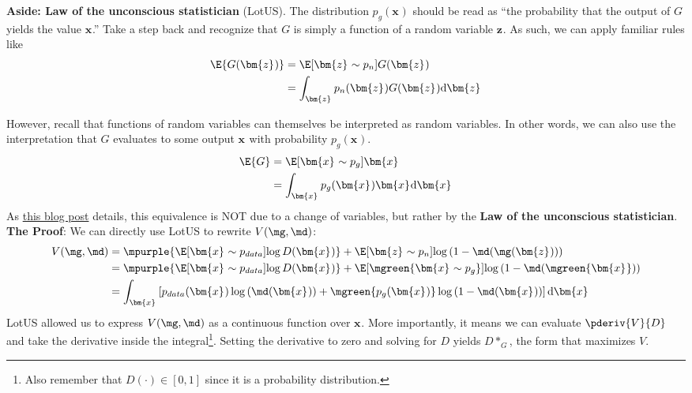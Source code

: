 \documentclass[11pt]{article}
\renewcommand\vec[2][]{\bm{#2}_{#1}}
\begin{document}
\begin{example}[Derivation of $D_G^*(\vec x)$.]

\textbf{Aside: Law of the unconscious statistician} (LotUS). 
	The distribution $p_g(\vec x)$ should be read as ``the probability that the output of $G$ yields the value $\vec x$.'' Take a step back and recognize that $G$ is simply a function of a random variable $\vec z$. As such, we can apply familiar rules like
	\begin{align}
		\E{G(\vec z)}
			&= \E[\vec z \sim p_n]{G(\vec z)} \\
			&= \int_{\vec z} p_n(\vec z) G(\vec z) \mathrm{d}\vec z
	\end{align}
	
	However, recall that functions of random variables can themselves be interpreted as random variables. In other words, we can also use the interpretation that $G$ evaluates to some output $\vec x$ with probability $p_g(\vec x)$. 
	\begin{align}
		\E{G} 
			&= \E[\vec x \sim p_g]{\vec x} \\
			&= \int_{\vec x} p_g(\vec x) \vec x \mathrm{d}\vec x
	\end{align}
	As \href{https://srome.github.io/An-Annotated-Proof-of-Generative-Adversarial-Networks-with-Implementation-Notes/}{this blog post} details, this equivalence is NOT due to a change of variables, but rather by the \textbf{Law of the unconscious statistician}. \\
	
	
\textbf{The Proof}: We can directly use LotUS to rewrite $V(\mg, \md)$:
	\begin{align}
		V(\mg, \md)
			&= \mpurple{ \E[\vec x \sim p_{data}]{\log D(\vec x)} } 
			+ \E[\vec z \sim p_n]{\log \left( 1 - \md ( \mg (\vec z) )  \right) } \\
			&=  \mpurple{ \E[\vec x \sim p_{data}]{\log D(\vec x)} } 
			+ \E[\mgreen{ \vec x \sim p_g } ]{  \log \left(1 -  \md (\mgreen{ \vec x } )   \right) } \\
			&= \int_{\vec x} \left[
				p_{data}(\vec x) \log \left(\md (\vec x)\right) +
				\mgreen{p_g(\vec x)} \log \left(1 - \md(\vec x)\right)
			\right] \mathrm{d} \vec x
	\end{align}
	LotUS allowed us to express $V(\mg, \md)$ as a continuous function over $\vec x$. More importantly, it means we can evaluate $\pderiv{V}{D}$ and take the derivative inside the integral\footnote{Also remember that $D(\cdot) \in [0, 1]$ since it is a probability distribution.}. Setting the derivative to zero and solving for $D$ yields $D*_G$, the form that maximizes $V$. 
\end{example}
\end{document}
